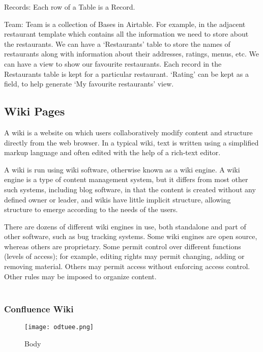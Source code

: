 Records: Each row of a Table is a Record.

Team: Team is a collection of Bases in Airtable.
For example, in the adjacent restaurant template which contains all the information we need to store about the restaurants. We can have a ‘Restaurants’ table to store the names of restaurants along with information about their addresses, ratings, menus, etc. We can have a view to show our favourite restaurants. Each record in the Restaurants table is kept for a particular restaurant. ‘Rating’ can be kept as a field, to help generate ‘My favourite restaurants’ view.



\subsection{Wiki Pages}

A wiki  is a website on which users collaboratively modify content and structure directly from the web browser. In a typical wiki, text is written using a simplified markup language and often edited with the help of a rich-text editor.

A wiki is run using wiki software, otherwise known as a wiki engine. A wiki engine is a type of content management system, but it differs from most other such systems, including blog software, in that the content is created without any defined owner or leader, and wikis have little implicit structure, allowing structure to emerge according to the needs of the users.

There are dozens of different wiki engines in use, both standalone and part of other software, such as bug tracking systems. Some wiki engines are open source, whereas others are proprietary. Some permit control over different functions (levels of access); for example, editing rights may permit changing, adding or removing material. Others may permit access without enforcing access control. Other rules may be imposed to organize content.
\\
\\
\subsubsection{Confluence  Wiki}


\begin{figure}[H]
\texttt{[image: odtuee.png]}\\[1cm]
\caption{\label{fig:cooling}Body }
\end{figure}


